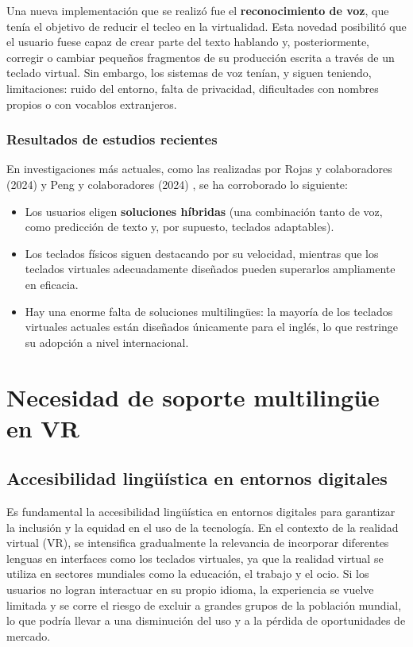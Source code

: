 	Una nueva implementación que se realizó fue el \textbf{reconocimiento de voz}, que tenía el objetivo de reducir el tecleo en la virtualidad. Esta novedad posibilitó que el usuario fuese capaz de crear parte del texto hablando y, posteriormente, corregir o cambiar pequeños fragmentos de su producción escrita a través de un teclado virtual. Sin embargo, los sistemas de voz tenían, y siguen teniendo, limitaciones: ruido del entorno, falta de privacidad, dificultades con nombres propios o con vocablos extranjeros.


\subsubsection{Resultados de estudios recientes}

En investigaciones más actuales, como las realizadas por Rojas y colaboradores (2024) \cite{rojas2024accented} y Peng y colaboradores (2024) \cite{peng2024exploring}, se ha corroborado lo siguiente:

\begin{itemize}
	\item Los usuarios eligen \textbf{soluciones híbridas} (una combinación   tanto de voz, como predicción de texto y, por supuesto, teclados adaptables).
	\item Los teclados físicos siguen destacando por su velocidad, mientras que los teclados virtuales adecuadamente diseñados pueden superarlos ampliamente en eficacia.
	
	 \item Hay una enorme falta de soluciones multilingües: la mayoría de los teclados virtuales actuales están diseñados únicamente para el inglés, lo que restringe su adopción a nivel internacional.
\end{itemize}


\section{Necesidad de soporte multilingüe en VR}
\subsection{Accesibilidad lingüística en entornos digitales}
Es fundamental la accesibilidad lingüística en entornos digitales para garantizar la inclusión y la equidad en el uso de la tecnología. En el contexto de la realidad virtual (VR), se intensifica gradualmente la relevancia de incorporar diferentes lenguas en interfaces como los teclados virtuales, ya que la realidad virtual se utiliza en sectores mundiales como la educación, el trabajo y el ocio. Si los usuarios no logran interactuar en su propio idioma, la experiencia se vuelve limitada y se corre el riesgo de excluir a grandes grupos de la población mundial, lo que podría llevar a una disminución del uso y a la pérdida de oportunidades de mercado. \cite{rojas2024} \cite{adaptiveVR} \cite{vrscience}

